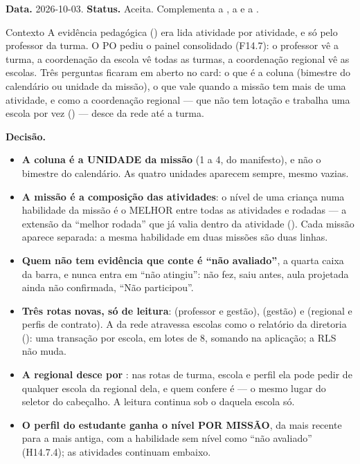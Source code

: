 \textbf{Data.} 2026-10-03. \textbf{Status.} Aceita. Complementa a
, a  e a .

\begin{especificacao}{Contexto}
A evidência pedagógica () era lida atividade por atividade, e só
pelo professor da turma. O PO pediu o painel consolidado (F14.7): o professor
vê a turma, a coordenação da escola vê todas as turmas, a coordenação regional
vê as escolas. Três perguntas ficaram em aberto no card: o que é a coluna
(bimestre do calendário ou unidade da missão), o que vale quando a missão tem
mais de uma atividade, e como a coordenação regional --- que não tem lotação e
trabalha uma escola por vez () --- desce da rede até a turma.
\end{especificacao}

\textbf{Decisão.}

\begin{itemize}
  \item \textbf{A coluna é a UNIDADE da missão} (1 a 4, do manifesto), e não o
    bimestre do calendário. As quatro unidades aparecem sempre, mesmo vazias.
  \item \textbf{A missão é a composição das atividades}: o nível de uma criança
    numa habilidade da missão é o MELHOR entre todas as atividades e rodadas
    --- a extensão da \enquote{melhor rodada} que já valia dentro da atividade
    (). Cada missão aparece separada:
    a mesma habilidade em duas missões são duas linhas.
  \item \textbf{Quem não tem evidência que conte é \enquote{não avaliado}}, a
    quarta caixa da barra, e nunca entra em \enquote{não atingiu}: não fez,
    saiu antes, aula projetada ainda não confirmada, \enquote{Não participou}.
  \item \textbf{Três rotas novas, só de leitura}:
     (professor e gestão),
     (gestão) e
     (regional e perfis de contrato). A
    da rede atravessa escolas como o relatório da diretoria (): uma
    transação por escola, em lotes de 8, somando na aplicação; a RLS não muda.
  \item \textbf{A regional desce por }: nas rotas de turma,
    escola e perfil ela pode pedir  de qualquer escola da regional
    dela, e quem confere é  --- o mesmo lugar do
    seletor do cabeçalho. A leitura continua sob o  daquela
    escola só.
  \item \textbf{O perfil do estudante ganha o nível POR MISSÃO}, da mais recente
    para a mais antiga, com a habilidade sem nível como \enquote{não avaliado}
    (H14.7.4); as atividades continuam embaixo.
\end{itemize}

